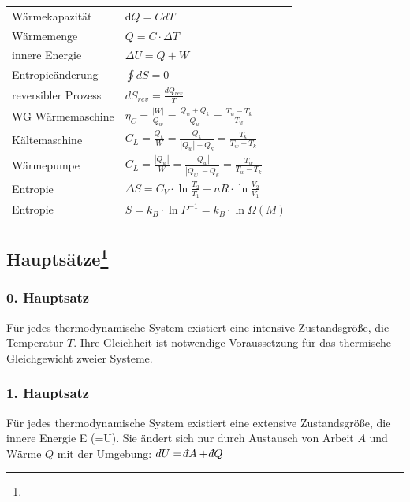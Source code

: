 \documentclass[12pt,a4paper]{article}
\renewcommand{\=}[1]{\stackrel{#1}{=}}
\def\dbar{{\mathchar'26\mkern-12mu d}}
\def\dbar{{\mathchar'26\mkern-12mu d}}
\theoremstyle{definition}
\theoremstyle{remark}
\begin{document}
\begin{center}
\begin{minipage}[t]{.55\linewidth}
\begin{tabular}{ll}
Wärmekapazität & d$Q = C dT$\\
Wärmemenge & $Q = C \cdot \Delta T$\\
innere Energie & $\Delta U = Q + W$\\
Entropieänderung & $\oint dS = 0$\\
reversibler Prozess & $dS_{rev} = \frac{dQ_{rev}}{T}$\\
WG Wärmemaschine & $\eta_C = \frac{|W|}{Q_w} = \frac{Q_w + Q_k}{Q_w} = \frac{T_w - T_k}{T_w}$\\
Kältemaschine & $C_L = \frac{Q_k}{W} = \frac{Q_k}{|Q_w| - Q_k} = \frac{T_k}{T_w - T_k}$ \\
Wärmepumpe & $C_L = \frac{|Q_w|}{W} = \frac{|Q_w|}{|Q_w| - Q_k} = \frac{T_w}{T_w - T_k}$ \\
Entropie & $\Delta S = C_V \cdot \ln \frac{T_2}{T_1} + nR \cdot \ln \frac{V_2}{V_1}$\\
Entropie & $S = k_B \cdot \ln P^{-1} = k_B \cdot \ln \Omega(M)$\\
\end{tabular}

\end{minipage}
\end{center}

\subsection[Hauptsätze]{Hauptsätze\let\thefootnote\relax\footnote{}}
\subsubsection{0. Hauptsatz}
\begin{framed} \noindent Für jedes thermodynamische System existiert eine intensive Zustandsgröße, die Temperatur $T$. Ihre Gleichheit ist notwendige Voraussetzung für das thermische Gleichgewicht zweier Systeme.\end{framed}

\subsubsection{1. Hauptsatz}
\begin{framed} \noindent Für jedes thermodynamische System existiert eine extensive Zustandsgröße, die innere Energie E (=U). Sie ändert sich nur durch Austausch von Arbeit $A$ und Wärme $Q$ mit der Umgebung: $dU = \dbar A + \dbar Q$ \end{framed}
\end{document}
